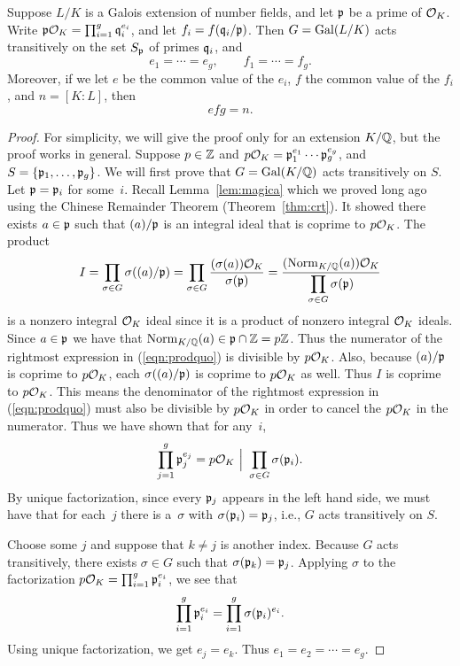 \begin{theorem}\label{thm:transitive}
	Suppose $L/K$ is a Galois extension of number fields,
	and let $\mathfrak{p}$ be a prime of $\mathcal{O}_K$. 
	Write $\mathfrak{p}\mathcal{O}_K = \prod_{i=1}^g \mathfrak{q}_i^{e_i}$, and let $f_i = f(\mathfrak{q}_i/\mathfrak{p})$.
	Then $G = \operatorname{Gal}(L/K)$ acts transitively on the set $S_{\mathfrak{p}}$ of primes $\mathfrak{q}_i$,
	and
	$$
		e_1 = \cdots = e_g, \qquad f_1 = \cdots = f_g.
	$$
	Moreover, if we let $e$ be the common value of the $e_i$,
	$f$ the common value of the $f_i$, and $n = [K:L]$, then
	$$
		efg = n.
	$$
\end{theorem}
\begin{proof}
	For simplicity, we will give the proof only for an extension $K/\mathbb{Q}$, but
	the proof works in general. Suppose $p\in\mathbb{Z}$ and
	$p\mathcal{O}_K=\mathfrak{p}_1^{e_1}\cdots \mathfrak{p}_g^{e_g}$, and $S=\{\mathfrak{p}_1,\ldots, \mathfrak{p}_g\}$.  We
	will first prove that $G = \operatorname{Gal}(K/\mathbb{Q})$ acts transitively on $S$. 
	Let $\mathfrak{p}=\mathfrak{p}_i$ for some~$i$.
	Recall Lemma~\ref{lem:magica} which we proved long ago using the
	Chinese Remainder Theorem (Theorem~\ref{thm:crt}). It showed there exists
	$a\in\mathfrak{p}$ such that $(a)/\mathfrak{p}$ is an integral ideal that is
	coprime to $p\mathcal{O}_K$.   The product
	\begin{equation}\label{eqn:prodquo}
		I= \prod_{\sigma\in G} \sigma((a)/\mathfrak{p})
		= \prod_{\sigma\in G} \frac{(\sigma(a))\mathcal{O}_K}{\sigma(\mathfrak{p})}
		= \frac{(\operatorname{Norm}_{K/\mathbb{Q}}(a))\mathcal{O}_K}{\displaystyle \prod_{\sigma\in G} \sigma(\mathfrak{p})}
	\end{equation}
	is a nonzero integral $\mathcal{O}_K$ ideal since it is a product of nonzero
	integral $\mathcal{O}_K$ ideals.
	Since $a\in \mathfrak{p}$ we have that
	$\operatorname{Norm}_{K/\mathbb{Q}}(a) \in \mathfrak{p}\cap\mathbb{Z}=p\mathbb{Z}$.  Thus the numerator of
	the rightmost expression in (\ref{eqn:prodquo}) is
	divisible by $p\mathcal{O}_K$.   Also, because $(a)/\mathfrak{p}$ is coprime
	to $p\mathcal{O}_K$, each $\sigma((a)/\mathfrak{p})$ is coprime to $p\mathcal{O}_K$
	as well.   Thus $I$ is coprime to $p\mathcal{O}_K$.   This means the
	denominator of the rightmost expression in (\ref{eqn:prodquo})
	must also be divisible by $p\mathcal{O}_K$ in order to cancel the $p\mathcal{O}_K$
	in the numerator.  Thus we have shown that for any~$i$,
	$$
		\prod_{j=1}^g \mathfrak{p}_j^{e_j}
		= p\mathcal{O}_K \,\,\Big|\,\, \prod_{\sigma\in G} \sigma(\mathfrak{p}_i).
	$$
	By unique factorization, since every $\mathfrak{p}_j$ appears in the left hand
	side, we must have that for each~$j$ there is a~$\sigma$ with
	$\sigma(\mathfrak{p}_i)=\mathfrak{p}_j$, i.e., $G$ acts transitively on $S$.

	Choose some $j$ and suppose that $k\neq j$ is another index.  Because
	$G$ acts transitively, there exists $\sigma\in G$ such that
	$\sigma(\mathfrak{p}_k)=\mathfrak{p}_j$.  Applying $\sigma$ to the factorization $p\mathcal{O}_K =
	\prod_{i=1}^g \mathfrak{p}_i^{e_i}$, we see that
	$$
		\prod_{i=1}^g \mathfrak{p}_i^{e_i} = \prod_{i=1}^g \sigma(\mathfrak{p}_i)^{e_i}.
	$$
	Using unique factorization,
	we get $e_j = e_k$.  Thus $e_1=e_2=\cdots = e_g$.


\end{proof}
